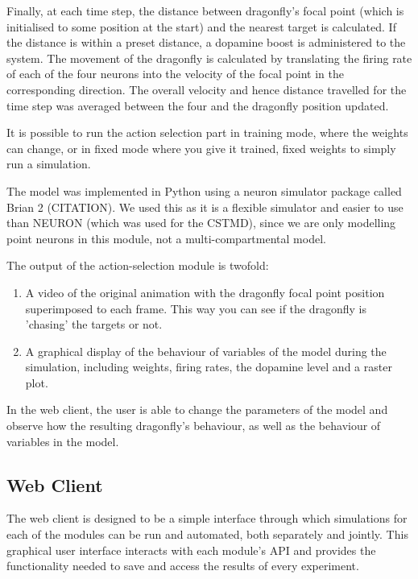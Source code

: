 \documentclass[a4paper,11pt]{article}
\begin{document}
Finally, at each time step, the distance between dragonfly's focal point (which is initialised to some position at the start) and the nearest target is calculated. If the distance is within a preset distance, a dopamine boost is administered to the system. The movement of the dragonfly is calculated by translating the firing rate of each of the four neurons into the velocity of the focal point in the corresponding direction. The overall velocity and hence distance travelled for the time step was averaged between the four and the dragonfly position updated. 

It is possible to run the action selection part in training mode, where the weights can change, or in fixed mode where you give it trained, fixed weights to simply run a simulation. 

The model was implemented in Python using a neuron simulator package called Brian 2 (CITATION). We used this as it is a flexible simulator and easier to use than NEURON (which was used for the CSTMD), since we are only modelling point neurons in this module, not a multi-compartmental model. 

The output of the action-selection module is twofold:
\begin{enumerate}
\item A video of the original animation with the dragonfly focal point position superimposed to each frame. This way you can see if the dragonfly is 'chasing' the targets or not.
\item A graphical display of the behaviour of variables of the model during the simulation, including weights, firing rates, the dopamine level and a raster plot.
\end{enumerate}
In the web client, the user is able to change the parameters of the model and observe how the resulting dragonfly's behaviour, as well as the behaviour of variables in the model.

\subsection{Web Client}

The web client is designed to be a simple interface through which simulations for each of the modules can be run and automated, both separately and jointly. This graphical user interface interacts with each module's API and provides the functionality needed to save and access the results of every experiment.
\end{document}
